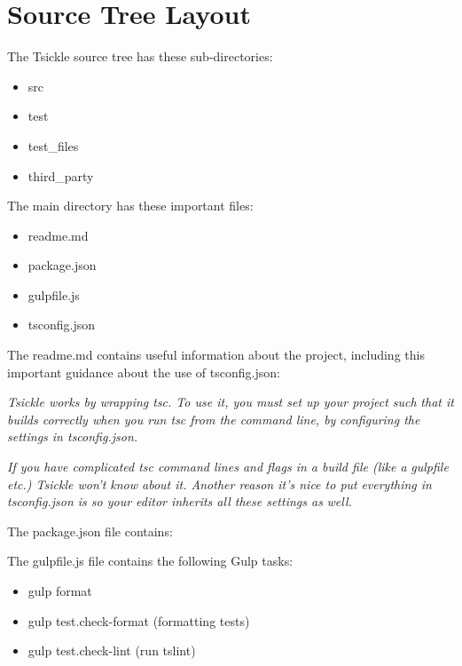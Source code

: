 \section{Source Tree Layout}

The Tsickle source tree has these sub-directories:

\begin{itemize}
  \item src
  \item test
  \item test\_files
  \item third\_party
\end{itemize}

The main directory has these important files:

\begin{itemize}
  \item readme.md
  \item package.json
  \item gulpfile.js
  \item tsconfig.json
\end{itemize}

The readme.md contains useful information about the project, including this important
guidance about the use of tsconfig.json:

\emph{Tsickle works by wrapping tsc. To use it, you must set up your project such}
\emph{that it builds correctly when you run tsc from the command line, by}
\emph{configuring the settings in tsconfig.json.}

\emph{If you have complicated tsc command lines and flags in a build file (like a}
\emph{gulpfile etc.) Tsickle won't know about it. Another reason it's nice to put}
\emph{everything in tsconfig.json is so your editor inherits all these settings as}
\emph{well.}

The package.json file contains:



The gulpfile.js file contains the following Gulp tasks:

\begin{itemize}
  \item gulp format
  \item gulp test.check-format (formatting tests)
  \item gulp test.check-lint (run tslint)
\end{itemize}
